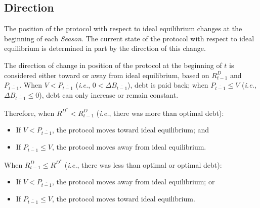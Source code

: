 \documentclass[tikz]{article}
\newcommand{\term}[1]{\textsl{#1}}
\begin{document}

\subsection{Direction}
\vspace{0.1cm}

The position of the protocol with respect to ideal equilibrium changes at the beginning of each \term{Season}. The current state of the protocol with respect to ideal equilibrium is determined in part by the direction of this change. 

\vspace{0.1cm}

The direction of change in position of the protocol at the beginning of $t$ is considered either toward or away from ideal equilibrium, based on $R_{t-1}^{D}$ and $P_{\overline{t-1}}$. When $V < P_{\overline{t-1}}$ (\textit{i.e.}, $0 < \Delta B_{\overline{t-1}}$), debt is paid back; when $P_{\overline{t-1}} \leq V$ (\textit{i.e.}, $\Delta B_{\overline{t-1}} \leq 0$), debt can only increase or remain constant.

\vspace{0.1cm}

Therefore, when $R^{D^{*}} < R_{t-1}^{D}$ (\textit{i.e.}, there was more than optimal debt):

\vspace{0.1cm}

\begin{itemize}[topsep=0pt, itemsep=1pt]
    \item If $V < P_{\overline{t-1}}$, the protocol moves toward ideal equilibrium; and \vspace{0.1cm}
    \item If $P_{\overline{t-1}} \leq V$, the protocol moves away from ideal equilibrium.
\end{itemize}

\vspace{0.1cm}

When $R_{t-1}^{D} \leq R^{D^{*}}$ (\textit{i.e.}, there was less than optimal or optimal debt):

\begin{itemize}[topsep=0pt, itemsep=1pt]
    \item If $V < P_{\overline{t-1}}$, the protocol moves away from ideal equilibrium; or \vspace{0.1cm}
    \item If $P_{\overline{t-1}} \leq V$, the protocol moves toward ideal equilibrium.
\end{itemize}
\end{document}
